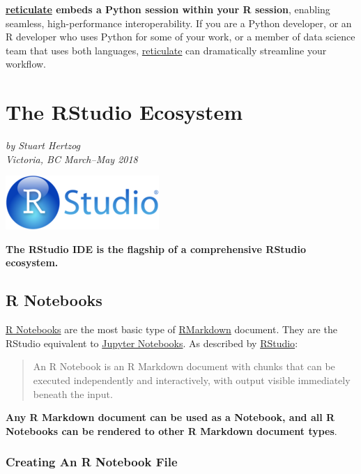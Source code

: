 \documentclass[]{book}
\theoremstyle{definition}
\theoremstyle{definition}
\theoremstyle{definition}
\theoremstyle{remark}
\begin{document}
\textbf{\href{https://rstudio.github.io/reticulate/index.html}{reticulate}
embeds a Python session within your R session}, enabling seamless,
high-performance interoperability. If you are a Python developer, or an
R developer who uses Python for some of your work, or a member of data
science team that uses both languages,
\href{https://rstudio.github.io/reticulate/index.html}{reticulate} can
dramatically streamline your workflow.

\hypertarget{the-rstudio-ecosystem}{%
\chapter{The RStudio Ecosystem}\label{the-rstudio-ecosystem}}

\emph{by Stuart Hertzog\\
Victoria, BC March--May 2018}

\includegraphics{images/RStudio_full_logo.png}

\textbf{The RStudio IDE is the flagship of a comprehensive RStudio
ecosystem.}

\hypertarget{r-notebooks}{%
\section{R Notebooks}\label{r-notebooks}}

\href{https://rmarkdown.rstudio.com/r_notebooks.html}{R Notebooks} are
the most basic type of \protect\hyperlink{rmarkdown}{RMarkdown}
document. They are the RStudio equivalent to
\href{https://jupyter.org/}{Jupyter Notebooks}. As described by
\href{https://rmarkdown.rstudio.com/r_notebooks.html}{RStudio}:

\begin{quote}
An R Notebook is an R Markdown document with chunks that can be executed
independently and interactively, with output visible immediately beneath
the input.
\end{quote}

\textbf{Any R Markdown document can be used as a Notebook, and all R
Notebooks can be rendered to other R Markdown document types}.

\hypertarget{creating-an-r-notebook-file}{%
\subsection{Creating An R Notebook
File}\label{creating-an-r-notebook-file}}
\end{document}
